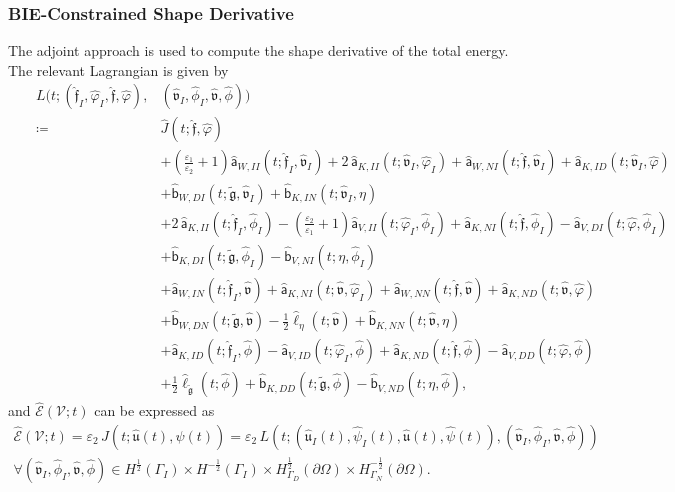 \documentclass{article}
\theoremstyle{remark}
\newcommand{\aaa}{\mathsf{a}}
\newcommand{\bbb}{\mathsf{b}}
\newcommand{\hata}{\widehat{\aaa}}
\newcommand{\hatb}{\widehat{\bbb}}
\newcommand{\hatell}{\widehat{\ell}}
\newcommand{\argu}{\mathfrak{u}}
\newcommand{\argv}{\mathfrak{v}}
\newcommand{\argf}{\mathfrak{f}}
\newcommand{\argg}{\mathfrak{g}}
\newcommand{\tildeg}{\widetilde{\argg}}
\newcommand{\hatu}{\widehat{\argu}}
\newcommand{\hatv}{\widehat{\argv}}
\newcommand{\hatf}{\widehat{\argf}}
\newcommand{\hatpsi}{\widehat{\psi}}
\newcommand{\hatphi}{\widehat{\phi}}
\newcommand{\hatvphi}{\widehat{\varphi}}
\newcommand{\Eps}{\mathcal{E}}
\newcommand{\hatEps}{\widehat{\Eps}}
\newcommand{\hatJ}{\widehat{J}}
\newcommand{\Nu}{\mathcal{V}}
\begin{document}
\subsubsection{BIE-Constrained Shape Derivative}
The adjoint approach is used to compute the shape derivative of the total energy. The relevant Lagrangian is given by
\begin{equation}
\begin{aligned}
    &&L(t;(\hatf_I,\hatvphi_I,\hatf,\hatvphi),&(\hatv_I,\hatphi_I,\hatv,\hatphi))\\
    &&\coloneqq&\hatJ(t;\hatf,\hatvphi)\\
    &&&+\left(\frac{\varepsilon_1}{\varepsilon_2}+1\right)\hata_{W,II}(t;\hatf_I,\hatv_I)+2\,\hata_{K,II}(t;\hatv_I,\hatvphi_I)+\hata_{W,NI}(t;\hatf,\hatv_I)+\hata_{K,ID}(t;\hatv_I,\hatvphi)\\
    &&&+\hatb_{W,DI}(t;\tildeg,\hatv_I)+\hatb_{K,IN}(t;\hatv_I,\eta)\\
    &&&+2\,\hata_{K,II}(t;\hatf_I,\hatphi_I)-\left(\frac{\varepsilon_2}{\varepsilon_1}+1\right)\hata_{V,II}(t;\hatvphi_I,\hatphi_I)+\hata_{K,NI}(t;\hatf,\hatphi_I)-\hata_{V,DI}(t;\hatvphi,\hatphi_I)\\
    &&&+\hatb_{K,DI}(t;\tildeg,\hatphi_I)-\hatb_{V,NI}(t;\eta,\hatphi_I)\\
    &&&+\hata_{W,IN}(t;\hatf_I,\hatv)+\hata_{K,NI}(t;\hatv,\hatvphi_I)+\hata_{W,NN}(t;\hatf,\hatv)+\hata_{K,ND}(t;\hatv,\hatvphi)\\
    &&&+\hatb_{W,DN}(t;\tildeg,\hatv)-\frac{1}{2}\hatell_{\eta}(t;\hatv)+\hatb_{K,NN}(t;\hatv,\eta)\\
    &&&+\hata_{K,ID}(t;\hatf_I,\hatphi)-\hata_{V,ID}(t;\hatvphi_I,\hatphi)+\hata_{K,ND}(t;\hatf,\hatphi)-\hata_{V,DD}(t;\hatvphi,\hatphi)\\
    &&&+\frac{1}{2}\hatell_{\tildeg}(t;\hatphi)+\hatb_{K,DD}(t;\tildeg,\hatphi)-\hatb_{V,ND}(t;\eta,\hatphi),
\end{aligned}
\end{equation}
and $\hatEps(\Nu;t)$ can be expressed as
\begin{multline}
    \hatEps(\Nu;t)
    =\varepsilon_2\,\hatJ(t;\hatu(t),\hatpsi(t))
    =\varepsilon_2\,L(t;(\hatu_I(t),\hatpsi_I(t),\hatu(t),\hatpsi(t)),(\hatv_I,\hatphi_I,\hatv,\hatphi))\\
    \forall(\hatv_I,\hatphi_I,\hatv,\hatphi)\in H^{\frac{1}{2}}(\Gamma_I)\times H^{-\frac{1}{2}}(\Gamma_I)\times H^{\frac{1}{2}}_{\Gamma_D}(\partial\Omega)\times H^{-\frac{1}{2}}_{\Gamma_N}(\partial\Omega).
\end{multline}
\end{document}
